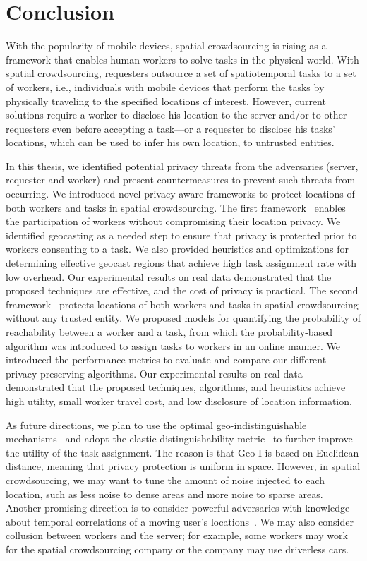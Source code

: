 \documentclass{USC-Thesis}
\numberwithin{equation}{chapter}
\begin{document}
\chapter{Conclusion}

With the popularity of mobile devices, spatial crowdsourcing is rising as a framework that enables
human workers to solve tasks in the physical world. With spatial crowdsourcing, requesters outsource a set of spatiotemporal tasks to a set of workers, i.e., individuals with mobile devices that perform the tasks by physically traveling to the specified locations of interest. However, current solutions require a worker to disclose his location to the server and/or to other requesters even before accepting a task---or a requester to disclose his tasks' locations, which can be used to infer his own location, to untrusted entities.

In this thesis, we identified potential privacy threats from the adversaries (server, requester and worker) and present countermeasures to prevent such threats from occurring. We introduced novel privacy-aware frameworks to protect locations of both workers and tasks in spatial crowdsourcing. 
The first framework~\cite{to2014framework} enables the participation of workers without compromising their location privacy.
We identified geocasting as a needed step to ensure that privacy is protected prior to workers consenting to a task. We also provided heuristics and optimizations for determining effective geocast regions that achieve high task assignment rate with low overhead. Our experimental results on real data demonstrated that the proposed techniques are effective, and the cost of privacy is practical.
The second framework~\cite{to2018privacy} protects locations of both workers and tasks in spatial crowdsourcing without any trusted entity. We proposed models for quantifying the probability of reachability between a worker and a task, from which the probability-based algorithm was introduced to assign tasks to workers in an online manner. We introduced the performance metrics to evaluate and compare our different privacy-preserving algorithms. Our experimental results on real data demonstrated that the proposed techniques, algorithms, and heuristics achieve high utility, small worker travel cost, and low disclosure of location information.

As future directions, we plan to use the optimal geo-indistinguishable mechanisms~\cite{bordenabe2014optimal} and adopt the elastic distinguishability metric~\cite{chatzikokolakis2015constructing} to further improve the utility of the task assignment. The reason is that Geo-I is based on Euclidean distance, meaning that privacy protection is uniform in space. However, in spatial crowdsourcing, we may want to tune the amount of noise injected to each location, such as less noise to dense areas and more noise to sparse areas. Another promising direction is to consider powerful adversaries with knowledge about temporal correlations of a moving user's locations~\cite{xiao2015protecting}. We may also consider collusion between workers and the server; for example, some workers may work for the spatial crowdsourcing company or the company may use driverless cars.

%
%



\balance

%
\end{document}
